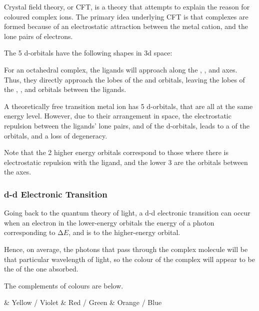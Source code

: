 			Crystal field theory, or CFT, is a theory that attempts to explain the reason for coloured complex ions. The primary idea
			underlying CFT is that complexes are formed because of an electrostatic attraction between the metal cation, and the lone
			pairs of electrons.

			The 5 d-orbitals have the following shapes in 3d space:


			For an octahedral complex, the ligands will approach along the , , and  axes. Thus, they directly approach
			the lobes of the  and  orbitals, leaving the lobes of the ,
			, and  orbitals between the ligands.

			A theoretically free transition metal ion has 5  d-orbitals, that are all at the same energy level. However, due
			to their arrangement in space, the electrostatic repulsion between the ligands' lone pairs, and  of the d-orbitals,
			leads to a  of the orbitals, and a loss of degeneracy.


			Note that the 2 higher energy orbitals correspond to those where there is electrostatic repulsion with the ligand, and the lower
			3 are the orbitals between the axes.

			\pagebreak
			\subsubsection{d-d Electronic Transition}

				Going back to the quantum theory of light, a d-d electronic transition can occur when an electron in the lower-energy orbitals
				 the energy of a photon corresponding to $∆E$, and is  to the higher-energy orbital.

				Hence, on average, the photons that pass through the complex molecule will be  that particular wavelength of
				light, so the colour of the complex will appear to be the  of the one absorbed.

				The complements of colours are below.

				\begin{bulletlist}
					& Yellow / Violet
					& Red / Green
					& Orange / Blue
				\end{bulletlist}

